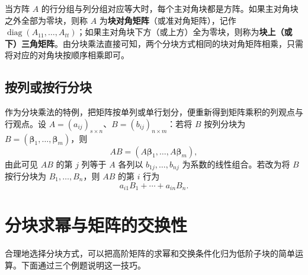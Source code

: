 \documentclass[UTF8, fontset=fandol, a4paper, 12pt]{ctexart}
\newcommand{\diag}{\operatorname{diag}}
\theoremstyle{definition}
\begin{document}
当方阵 $A$ 的行分组与列分组对应等大时，每个主对角块都是方阵。如果主对角块之外全部为零块，则称 $A$ 为\textbf{块对角矩阵}（或准对角矩阵），记作 $\diag(A_{11},\ldots,A_{tt})$；如果主对角块下方（或上方）全为零块，则称为\textbf{块上（或下）三角矩阵}。由分块乘法直接可知，两个分块方式相同的块对角矩阵相乘，只需将对应的对角块按顺序相乘即可。

\subsection{按列或按行分块}

作为分块乘法的特例，把矩阵按单列或单行划分，便重新得到矩阵乘积的列观点与行观点。设 $A=(a_{ij})_{s\times n}$、$B=(b_{ij})_{n\times m}$：若将 $B$ 按列分块为 $B=(\boldsymbol{\beta}_1,\ldots,\boldsymbol{\beta}_m)$，则
\[
 AB=(A\boldsymbol{\beta}_1,\ldots,A\boldsymbol{\beta}_m),
\]
由此可见 $AB$ 的第 $j$ 列等于 $A$ 各列以 $b_{1j},\ldots,b_{nj}$ 为系数的线性组合。若改为将 $B$ 按行分块为 $B_1,\ldots,B_n$，则 $AB$ 的第 $i$ 行为
\[
 a_{i1}B_1+\cdots+a_{in}B_n.
\]

\section{分块求幂与矩阵的交换性}

合理地选择分块方式，可以把高阶矩阵的求幂和交换条件化归为低阶子块的简单运算。下面通过三个例题说明这一技巧。
\end{document}
